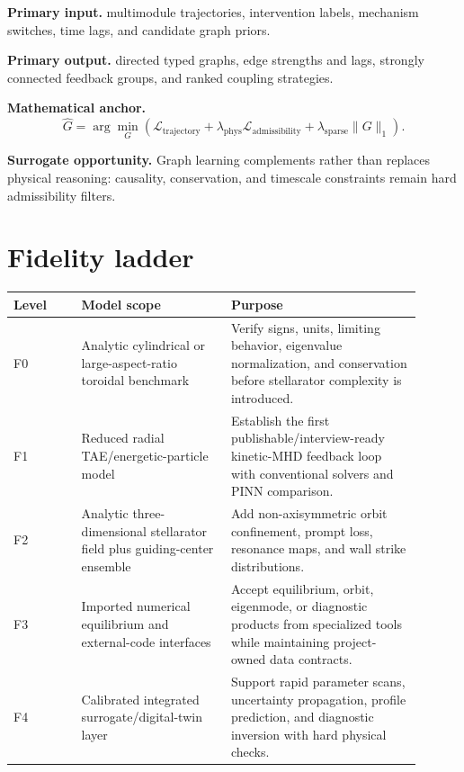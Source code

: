 \documentclass[11pt]{article}
\begin{document}
\textbf{Primary input.} multimodule trajectories, intervention labels, mechanism switches, time lags, and candidate graph priors.

\textbf{Primary output.} directed typed graphs, edge strengths and lags, strongly connected feedback groups, and ranked coupling strategies.

\textbf{Mathematical anchor.}
\begin{equation}
\widehat G=\arg\min_G\left(\mathcal L_{\mathrm{trajectory}}+\lambda_{\mathrm{phys}}\mathcal L_{\mathrm{admissibility}}+\lambda_{\mathrm{sparse}}\lVert G\rVert_1\right).
\end{equation}

\textbf{Surrogate opportunity.} Graph learning complements rather than replaces physical reasoning: causality, conservation, and timescale constraints remain hard admissibility filters.


\section{Fidelity ladder}
\begin{longtable}{p{0.15\linewidth} p{0.33\linewidth} p{0.42\linewidth}}
\toprule
\textbf{Level} & \textbf{Model scope} & \textbf{Purpose}\\
\midrule
F0 & Analytic cylindrical or large-aspect-ratio toroidal benchmark & Verify signs, units, limiting behavior, eigenvalue normalization, and conservation before stellarator complexity is introduced.\\
F1 & Reduced radial TAE/energetic-particle model & Establish the first publishable/interview-ready kinetic-MHD feedback loop with conventional solvers and PINN comparison.\\
F2 & Analytic three-dimensional stellarator field plus guiding-center ensemble & Add non-axisymmetric orbit confinement, prompt loss, resonance maps, and wall strike distributions.\\
F3 & Imported numerical equilibrium and external-code interfaces & Accept equilibrium, orbit, eigenmode, or diagnostic products from specialized tools while maintaining project-owned data contracts.\\
F4 & Calibrated integrated surrogate/digital-twin layer & Support rapid parameter scans, uncertainty propagation, profile prediction, and diagnostic inversion with hard physical checks.\\
\bottomrule
\end{longtable}
\end{document}
